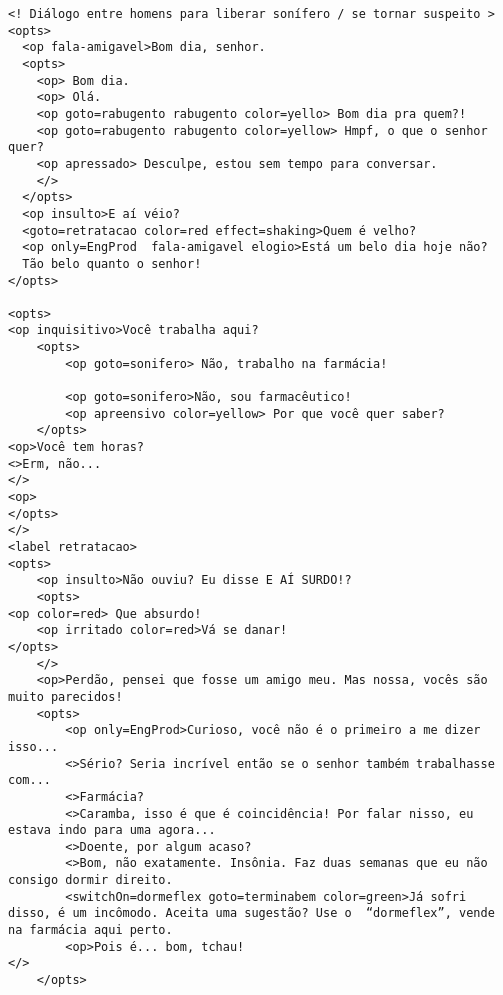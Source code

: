 {\footnotesize
\begin{verbatim}
<! Diálogo entre homens para liberar sonífero / se tornar suspeito >
<opts>
  <op fala-amigavel>Bom dia, senhor.
  <opts>
    <op> Bom dia.
    <op> Olá.
    <op goto=rabugento rabugento color=yello> Bom dia pra quem?!
    <op goto=rabugento rabugento color=yellow> Hmpf, o que o senhor quer?
    <op apressado> Desculpe, estou sem tempo para conversar.
    </>
  </opts>
  <op insulto>E aí véio?
  <goto=retratacao color=red effect=shaking>Quem é velho?
  <op only=EngProd  fala-amigavel elogio>Está um belo dia hoje não?
  Tão belo quanto o senhor!
</opts>

<opts>
<op inquisitivo>Você trabalha aqui?
	<opts>
		<op goto=sonifero> Não, trabalho na farmácia!
		
		<op goto=sonifero>Não, sou farmacêutico!
		<op apreensivo color=yellow> Por que você quer saber?
	</opts>
<op>Você tem horas?
<>Erm, não...
</>
<op>
</opts>
</>
<label retratacao>
<opts>
	<op insulto>Não ouviu? Eu disse E AÍ SURDO!?
	<opts>
<op color=red> Que absurdo!
	<op irritado color=red>Vá se danar!
</opts>
	</>
	<op>Perdão, pensei que fosse um amigo meu. Mas nossa, vocês são muito parecidos!
	<opts>
		<op only=EngProd>Curioso, você não é o primeiro a me dizer isso...
		<>Sério? Seria incrível então se o senhor também trabalhasse com...
		<>Farmácia?
		<>Caramba, isso é que é coincidência! Por falar nisso, eu estava indo para uma agora...
		<>Doente, por algum acaso?
		<>Bom, não exatamente. Insônia. Faz duas semanas que eu não consigo dormir direito.
		<switchOn=dormeflex goto=terminabem color=green>Já sofri disso, é um incômodo. Aceita uma sugestão? Use o  “dormeflex”, vende na farmácia aqui perto.
		<op>Pois é... bom, tchau!
</>
	</opts>


\end{verbatim}}
